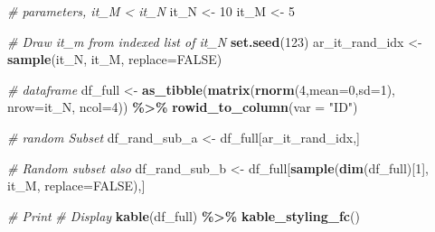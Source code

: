 \documentclass[
]{book}
\newenvironment{Shaded}{\begin{snugshade}}{\end{snugshade}}
\newcommand{\CommentTok}[1]{\textcolor[rgb]{0.56,0.35,0.01}{\textit{#1}}}
\newcommand{\DataTypeTok}[1]{\textcolor[rgb]{0.13,0.29,0.53}{#1}}
\newcommand{\DecValTok}[1]{\textcolor[rgb]{0.00,0.00,0.81}{#1}}
\newcommand{\KeywordTok}[1]{\textcolor[rgb]{0.13,0.29,0.53}{\textbf{#1}}}
\newcommand{\NormalTok}[1]{#1}
\newcommand{\OperatorTok}[1]{\textcolor[rgb]{0.81,0.36,0.00}{\textbf{#1}}}
\newcommand{\OtherTok}[1]{\textcolor[rgb]{0.56,0.35,0.01}{#1}}
\newcommand{\StringTok}[1]{\textcolor[rgb]{0.31,0.60,0.02}{#1}}
\begin{document}
\begin{Shaded}
\begin{Highlighting}[]
\CommentTok{\# parameters, it\_M \textless{} it\_N}
\NormalTok{it\_N \textless{}{-}}\StringTok{ }\DecValTok{10}
\NormalTok{it\_M \textless{}{-}}\StringTok{ }\DecValTok{5}

\CommentTok{\# Draw it\_m from indexed list of it\_N}
\KeywordTok{set.seed}\NormalTok{(}\DecValTok{123}\NormalTok{)}
\NormalTok{ar\_it\_rand\_idx \textless{}{-}}\StringTok{ }\KeywordTok{sample}\NormalTok{(it\_N, it\_M, }\DataTypeTok{replace=}\OtherTok{FALSE}\NormalTok{)}

\CommentTok{\# dataframe}
\NormalTok{df\_full \textless{}{-}}\StringTok{ }\KeywordTok{as\_tibble}\NormalTok{(}\KeywordTok{matrix}\NormalTok{(}\KeywordTok{rnorm}\NormalTok{(}\DecValTok{4}\NormalTok{,}\DataTypeTok{mean=}\DecValTok{0}\NormalTok{,}\DataTypeTok{sd=}\DecValTok{1}\NormalTok{), }\DataTypeTok{nrow=}\NormalTok{it\_N, }\DataTypeTok{ncol=}\DecValTok{4}\NormalTok{)) }\OperatorTok{\%\textgreater{}\%}\StringTok{ }\KeywordTok{rowid\_to\_column}\NormalTok{(}\DataTypeTok{var =} \StringTok{"ID"}\NormalTok{)}

\CommentTok{\# random Subset}
\NormalTok{df\_rand\_sub\_a \textless{}{-}}\StringTok{ }\NormalTok{df\_full[ar\_it\_rand\_idx,]}

\CommentTok{\# Random subset also}
\NormalTok{df\_rand\_sub\_b \textless{}{-}}\StringTok{ }\NormalTok{df\_full[}\KeywordTok{sample}\NormalTok{(}\KeywordTok{dim}\NormalTok{(df\_full)[}\DecValTok{1}\NormalTok{], it\_M, }\DataTypeTok{replace=}\OtherTok{FALSE}\NormalTok{),]}

\CommentTok{\# Print}
\CommentTok{\# Display}
\KeywordTok{kable}\NormalTok{(df\_full) }\OperatorTok{\%\textgreater{}\%}\StringTok{ }\KeywordTok{kable\_styling\_fc}\NormalTok{()}
\end{Highlighting}
\end{Shaded}
\end{document}
